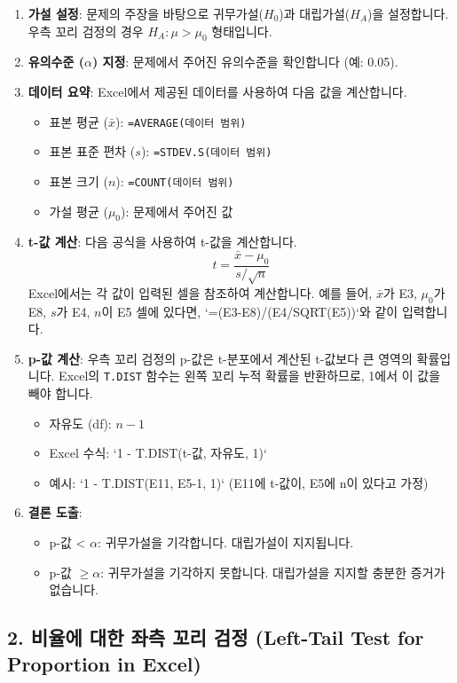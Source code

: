 \documentclass[11pt,a4paper]{article}
\begin{document}
\begin{enumerate}
    \item \textbf{가설 설정}: 문제의 주장을 바탕으로 귀무가설($H_0$)과 대립가설($H_A$)을 설정합니다. 우측 꼬리 검정의 경우 $H_A: \mu > \mu_0$ 형태입니다.
    \item \textbf{유의수준 ($\alpha$) 지정}: 문제에서 주어진 유의수준을 확인합니다 (예: 0.05).
    \item \textbf{데이터 요약}: Excel에서 제공된 데이터를 사용하여 다음 값을 계산합니다.
    \begin{itemize}
        \item 표본 평균 ($\bar{x}$): \texttt{=AVERAGE(데이터 범위)}
        \item 표본 표준 편차 ($s$): \texttt{=STDEV.S(데이터 범위)}
        \item 표본 크기 ($n$): \texttt{=COUNT(데이터 범위)}
        \item 가설 평균 ($\mu_0$): 문제에서 주어진 값
    \end{itemize}
    \item \textbf{t-값 계산}: 다음 공식을 사용하여 t-값을 계산합니다.
    $$t = \frac{\bar{x} - \mu_0}{s/\sqrt{n}}$$
    Excel에서는 각 값이 입력된 셀을 참조하여 계산합니다. 예를 들어, $\bar{x}$가 E3, $\mu_0$가 E8, $s$가 E4, $n$이 E5 셀에 있다면, `=(E3-E8)/(E4/SQRT(E5))`와 같이 입력합니다.
    \item \textbf{p-값 계산}: 우측 꼬리 검정의 p-값은 t-분포에서 계산된 t-값보다 큰 영역의 확률입니다. Excel의 \texttt{T.DIST} 함수는 왼쪽 꼬리 누적 확률을 반환하므로, 1에서 이 값을 빼야 합니다.
    \begin{itemize}
        \item 자유도 (df): $n-1$
        \item Excel 수식: `1 - T.DIST(t-값, 자유도, 1)`
        \item 예시: `1 - T.DIST(E11, E5-1, 1)` (E11에 t-값이, E5에 n이 있다고 가정)
    \end{itemize}
    \item \textbf{결론 도출}:
    \begin{itemize}
        \item p-값 < $\alpha$: 귀무가설을 기각합니다. 대립가설이 지지됩니다.
        \item p-값 $\ge \alpha$: 귀무가설을 기각하지 못합니다. 대립가설을 지지할 충분한 증거가 없습니다.
    \end{itemize}
\end{enumerate}

\subsection*{2. 비율에 대한 좌측 꼬리 검정 (Left-Tail Test for Proportion in Excel)}
\end{document}
